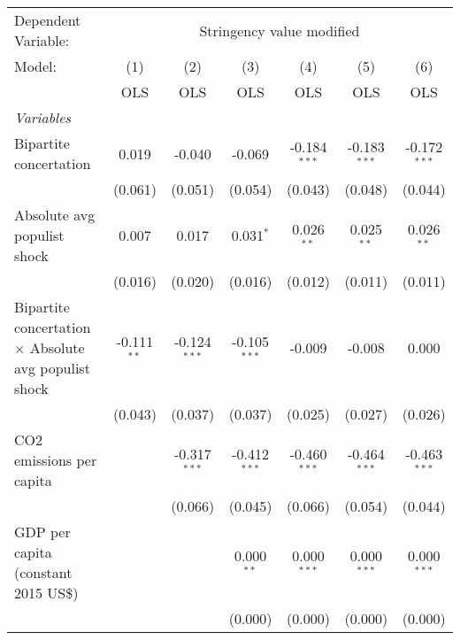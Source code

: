
\begingroup
\centering
\begin{tabular}{lcccccc}
   \toprule
   Dependent Variable: & \multicolumn{6}{c}{Stringency value modified}\\
   Model:                                                       & (1)           & (2)            & (3)            & (4)            & (5)            & (6)\\  
                                                                &  OLS          & OLS            & OLS            & OLS            & OLS            & OLS\\  
   \midrule
   \emph{Variables}\\
   Bipartite concertation                                       & 0.019         & -0.040         & -0.069         & -0.184$^{***}$ & -0.183$^{***}$ & -0.172$^{***}$\\   
                                                                & (0.061)       & (0.051)        & (0.054)        & (0.043)        & (0.048)        & (0.044)\\   
   Absolute avg populist shock                                  & 0.007         & 0.017          & 0.031$^{*}$    & 0.026$^{**}$   & 0.025$^{**}$   & 0.026$^{**}$\\   
                                                                & (0.016)       & (0.020)        & (0.016)        & (0.012)        & (0.011)        & (0.011)\\   
   Bipartite concertation $\times$ Absolute avg populist shock  & -0.111$^{**}$ & -0.124$^{***}$ & -0.105$^{***}$ & -0.009         & -0.008         & 0.000\\   
                                                                & (0.043)       & (0.037)        & (0.037)        & (0.025)        & (0.027)        & (0.026)\\   
   CO2 emissions per capita                                     &               & -0.317$^{***}$ & -0.412$^{***}$ & -0.460$^{***}$ & -0.464$^{***}$ & -0.463$^{***}$\\   
                                                                &               & (0.066)        & (0.045)        & (0.066)        & (0.054)        & (0.044)\\   
   GDP per capita (constant 2015 US\$)                          &               &                & 0.000$^{**}$   & 0.000$^{***}$  & 0.000$^{***}$  & 0.000$^{***}$\\   
                                                                &               &                & (0.000)        & (0.000)        & (0.000)        & (0.000)\\   

\end{tabular}
